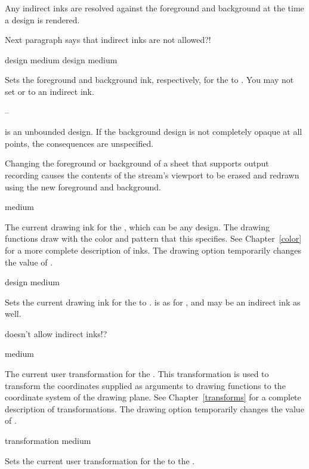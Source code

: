 Any indirect inks are resolved against the foreground and background at the time
a design is rendered.

 {Next paragraph says that indirect inks are not allowed?!}

 {design medium}
 {design medium}

Sets the foreground and background ink, respectively, for the 
 to .  You may not set  or
 to an indirect ink.  

--

 is an unbounded design.  If the background design is not completely
opaque at all points, the consequences are unspecified.

Changing the foreground or background of a sheet that supports output recording
causes the contents of the stream's viewport to be erased and redrawn using the
new foreground and background.


 {medium}

The current drawing ink for the  , which can be any
design.  The drawing functions draw with the color and pattern that this
specifies.  See Chapter~\ref{color} for a more complete description of inks.
The  drawing option temporarily changes the value of .

 {design medium}

Sets the current drawing ink for the   to .
 is as for , and may be an indirect ink as
well.

 { doesn't allow indirect inks!?}

 {medium}

The current user transformation for the  .  This
transformation is used to transform the coordinates supplied as arguments to
drawing functions to the coordinate system of the drawing plane.  See
Chapter~\ref{transforms} for a complete description of transformations.  The
 drawing option temporarily changes the value of
.

 {transformation medium}

Sets the current user transformation for the   to the
 .


